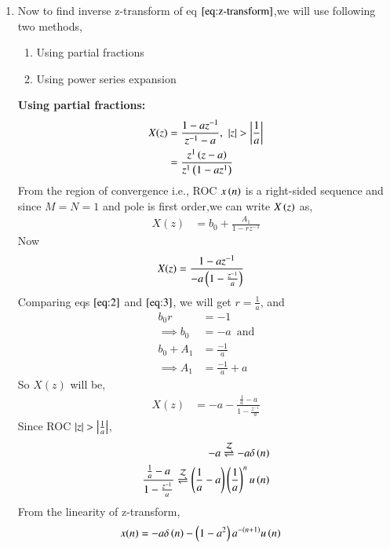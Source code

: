 \documentclass[journal,12pt,twocolumn]{IEEEtran}
\begin{document}
   \begin{enumerate}
    \item Now to find inverse z-transform of eq $\eqref{eq:z-transform}$,we will use following two methods,
   \begin{enumerate}
    \item Using partial fractions
    \item Using power series expansion
   \end{enumerate}
   \textbf{Using partial fractions:} \\
     \begin{align}
      X(z) &= \frac{1-az^{-1}}{z^{-1} - a} , \, \, \left\vert z\right\vert > \left\vert\frac{1}{a}\right\vert \\
         &= \frac{z^1\left(z-a\right)}{z^1\left(1-az^1\right)} 
     \end{align}
    From the region of convergence i.e., ROC $x\left(n\right)$ is a right-sided sequence and since $M = N = 1$ and pole is first order,we can write $X\left(z\right)$ as,
     \begin{align}
      X(z) &= b_{0} + \frac{A_{1}}{1-rz^{-1}} \label{eq:2}
     \end{align}
    Now 
     \begin{align}
       X(z) &= \frac{1 - az^{-1}}{-a\left(1 - \frac{z^{-1}}{a}\right)}\label{eq:3}
     \end{align}   
    Comparing eqs $\eqref{eq:2}$ and $\eqref{eq:3}$, we will get $r = \frac{1}{a}$, and 
     \begin{align}
       b_{0}r &= -1 \\
       \implies b_{0} &= -a \, \, \,  \text{and}\\ 
       b_{0} + A_{1} &= \frac{-1}{a} \\
       \implies A_{1} &= \frac{-1}{a} + a
     \end{align}
    So $X(z)$ will be,
     \begin{align}
       X(z) &=  -a - \frac{\frac{1}{a} - a}{1 - \frac{z^{-1}}{a}}
     \end{align}
    Since ROC $\left\vert z\right\vert > \left\vert\frac{1}{a}\right\vert$,
     \begin{align}
         -a \overset{\mathcal{Z}}{ \rightleftharpoons} -a\delta\left(n\right)\\
         \frac{\frac{1}{a} - a}{1 - \frac{z^{-1}}{a}} \overset{\mathcal{Z}}{ \rightleftharpoons} \left(\frac{1}{a} - a\right)\left(\frac{1}{a}\right)^nu\left(n\right)\\
     \end{align}
     From the linearity of z-transform,
     \begin{align}
       x(n) &= -a\delta\brak{n} -\brak{1-a^2}a^{-\brak{n+1}}u\brak{n}

\end{align}
\end{enumerate}
\end{document}
